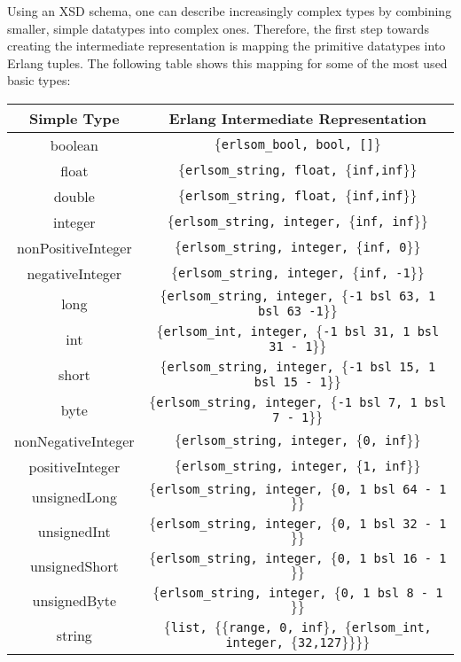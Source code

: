 \documentclass[submission,copyright]{eptcs}
\begin{document}
Using an XSD schema, one can describe increasingly complex types by combining
smaller, simple datatypes into complex ones. Therefore, the first step towards 
creating the intermediate representation is mapping the primitive datatypes 
into Erlang tuples. The following table shows this mapping for some of the
most used basic types:

\begin{center}\footnotesize
  \begin{tabular}{cc}
    \toprule
    Simple Type & Erlang Intermediate Representation \\
    \midrule
    boolean & \texttt{$\{$erlsom\_bool, bool, []$\}$}\\
    float & \texttt{$\{$erlsom\_string, float, $\{$inf,inf$\}\}$}\\
    double & \texttt{$\{$erlsom\_string, float, $\{$inf,inf$\}\}$}\\
    integer & \texttt{$\{$erlsom\_string, integer, $\{$inf, inf$\}\}$}\\
    nonPositiveInteger & \texttt{$\{$erlsom\_string, integer, $\{$inf, 0$\}\}$}\\
    negativeInteger & \texttt{$\{$erlsom\_string, integer, $\{$inf, -1$\}\}$}\\
    long & \texttt{$\{$erlsom\_string, integer, $\{$-1 bsl 63, 1 bsl 63 -1$\}\}$}\\
    int & \texttt{$\{$erlsom\_int, integer, $\{$-1 bsl 31, 1 bsl 31 - 1$\}\}$}\\
    short & \texttt{$\{$erlsom\_string, integer, $\{$-1 bsl 15, 1 bsl 15 - 1$\}\}$}\\
    byte & \texttt{$\{$erlsom\_string, integer, $\{$-1 bsl 7, 1 bsl 7 - 1$\}\}$}\\
    nonNegativeInteger & \texttt{$\{$erlsom\_string, integer, $\{$0, inf$\}\}$}\\
    positiveInteger & \texttt{$\{$erlsom\_string, integer, $\{$1, inf$\}\}$}\\
    unsignedLong & \texttt{$\{$erlsom\_string, integer, $\{$0, 1 bsl 64 - 1$\}\}$}\\
    unsignedInt & \texttt{$\{$erlsom\_string, integer, $\{$0, 1 bsl 32 - 1$\}\}$}\\
    unsignedShort & \texttt{$\{$erlsom\_string, integer, $\{$0, 1 bsl 16 - 1$\}\}$}\\
    unsignedByte & \texttt{$\{$erlsom\_string, integer, $\{$0, 1 bsl 8 - 1$\}\}$}\\
    string & \texttt{$\{$list, $\{\{$range, 0, inf$\}$, $\{$erlsom\_int, integer, $\{$32,127$\}\}\}\}$}\\
    \bottomrule
  \end{tabular}
\end{center}
\end{document}
